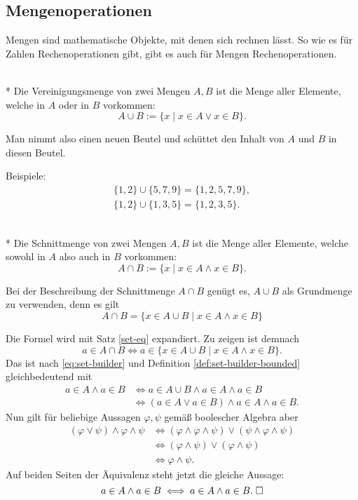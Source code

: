 \newpage
\subsection{Mengenoperationen}

Mengen sind mathematische Objekte, mit denen sich rechnen lässt.
So wie es für Zahlen Rechenoperationen gibt, gibt es auch für
Mengen Rechenoperationen.
\begin{Definition}[Vereinigungsmenge]%
\mbox{}\\*
Die Vereinigungsmenge von zwei Mengen $A,B$ ist die Menge aller Elemente,
welche in $A$ oder in $B$ vorkommen:
\[A\cup B := \{x\mid x\in A\lor x\in B\}.\]
\end{Definition}
Man nimmt also einen neuen Beutel und schüttet den Inhalt von $A$
und $B$ in diesen Beutel.

Beispiele:
\begin{gather*}
\{1,2\}\cup\{5,7,9\} = \{1,2,5,7,9\},\\
\{1,2\}\cup\{1,3,5\} = \{1,2,3,5\}.
\end{gather*}

\begin{Definition}[Schnittmenge]%
\mbox{}\\*
Die Schnittmenge von zwei Mengen $A,B$ ist die Menge aller Elemente,
welche sowohl in $A$ also auch in $B$ vorkommen:
\[A\cap B := \{x\mid x\in A\land x\in B\}.\]
\end{Definition}
\begin{Satz}
Bei der Beschreibung der Schnittmenge $A\cap B$ genügt es, $A\cup B$ als Grundmenge
zu verwenden, denn es gilt
\[A\cap B = \{x\in A\cup B\mid x\in A\land x\in B\}\]
\end{Satz}
Die Formel wird mit Satz \ref{set-eq} expandiert. Zu zeigen ist demnach
\[a\in A\cap B\iff a\in \{x\in A\cup B\mid x\in A\land x\in B\}.\]
Das ist nach \eqref{eq:set-builder} und Definition
\ref{def:set-builder-bounded} gleichbedeutend mit
\begin{align*}
a\in A\land a\in B&\iff a\in A\cup B\land a\in A\land a\in B\\
&\iff (a\in A\lor a\in B)\land a\in A\land a\in B.
\end{align*}
Nun gilt für beliebige Aussagen $\varphi,\psi$ gemäß boolescher Algebra aber
\begin{align*}
(\varphi\lor\psi)\land\varphi\land\psi
&\iff (\varphi\land\varphi\land\psi)\lor(\psi\land\varphi\land\psi)\\
&\iff (\varphi\land\psi)\lor(\varphi\land\psi)\\
&\iff \varphi\land\psi.
\end{align*}
Auf beiden Seiten der Äquivalenz steht jetzt die gleiche Aussage:%
\[a\in A\land a\in B\iff a\in A\land a\in B.\;\Box\]

